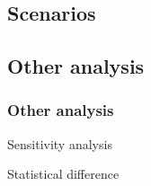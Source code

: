\subsection{Scenarios}
\begin{frame}
\end{frame}

\subsection{Other analysis}
\begin{frame}
\frametitle{Other analysis}
Sensitivity analysis

Statistical difference
\end{frame}


